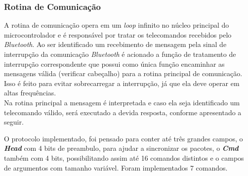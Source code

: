 \subsubsection{Rotina de Comunicação}
A rotina de comunicação opera em um \emph{loop} infinito no núcleo principal do microcontrolador e é responsável por tratar os telecomandos recebidos pelo \textit{Bluetooth}. Ao ser identificado um recebimento de mensagem pela sinal de interrupção da comunicação \textit{Bluetooth} é acionado a função de tratamento de interrupção correspondente que possui como única função encaminhar as mensagens válida (verificar cabeçalho) para a rotina principal de comunicação. Isso é feito para evitar sobrecarregar a interrupção, já que ela deve operar em altas frequências.\\

Na rotina principal a mensagem é interpretada e caso ela seja identificado um telecomando válido, será executado a devida resposta, conforme apresentado a seguir.

O protocolo implementado, foi pensado para conter até três grandes campos, o \textbf{\textit{Head}} com 4 bits de preambulo, para ajudar a sincronizar os pacotes, o \textbf{\textit{Cmd}} também com 4 bits, possibilitando assim até 16 comandos distintos e o campos de argumentos com tamanho variável. Foram implementados 7 comandos. 


    
